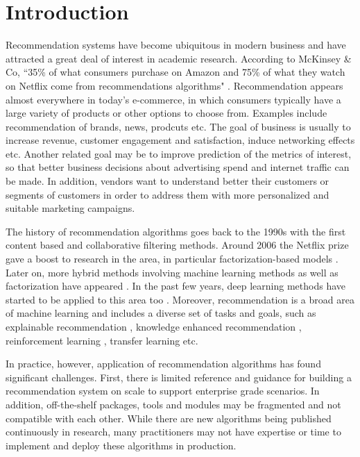 \section{Introduction}

Recommendation systems have become ubiquitous in modern business and have attracted a great deal of interest in academic research.
According to McKinsey \& Co,
“35\% of what consumers purchase on Amazon and 75\% of what they watch on Netflix come from recommendations algorithms" 
\cite{mckinsey}.
Recommendation appears almost everywhere in today's e-commerce, in which consumers typically have a large variety of products or other
options to choose from. Examples include recommendation of brands, news, prodcuts etc. The goal of business is usually to increase revenue,
customer engagement and satisfaction, induce networking effects etc. Another related goal may be to improve prediction of the metrics of interest, 
so that better business decisions about advertising spend and internet traffic can be made. In addition, vendors want to understand better their customers
or segments of customers in order to address them with more personalized and suitable marketing campaigns.

The history of recommendation algorithms goes back to the 1990s \cite{Tapestry, GroupLens}
with the first content based and collaborative filtering methods.
Around 2006 the Netflix prize \cite{} gave a boost to research in the area, in particular 
factorization-based models \cite{koren2009matrix,SVD++,PMF}.
Later on, more hybrid methods involving machine learning methods as well as factorization have appeared
\cite{FM,pairwise}.
In the past few years, deep learning methods have started to be applied to this area too
\cite{PNN,cheng2016wide,DeepFM,lian2018xdeepfm,he2017neural}.
Moreover, recommendation is a broad area of machine learning and includes a diverse set of tasks and goals, such as 
explainable recommendation \cite{}, knowledge enhanced recommendation \cite{},
reinforcement learning \cite{}, transfer learning \cite{} etc.

In practice, however, application of recommendation algorithms has found significant challenges. 
First, there is limited reference and guidance for building a recommendation system on scale to support
enterprise grade scenarios. In addition, off-the-shelf packages, tools and modules may be fragmented and not compatible with
each other. While there are new algorithms being published continuously in research, many practitioners may not have 
expertise or time to implement and deploy these algorithms in production.

